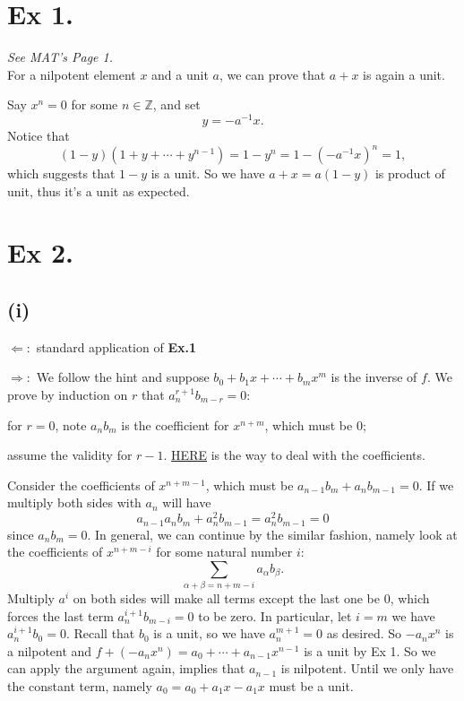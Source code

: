 
\section{Ex 1.}\label{Atiyah Chapter 1 Ex 1.}
\textit{See MAT's Page 1.}\\
For a nilpotent element $x$ and a unit $a$, we can prove that $a+x$ is again a unit.

Say $x^n=0$ for some $n\in\mathbb Z$, and set $$y=-a^{-1}x.$$
Notice that 
$$(1-y)(1+y+\cdots+y^{n-1})=1-y^n=1-(-a^{-1}x)^n=1,$$ which suggests that $1-y$ is a unit.
So we have $a+x=a(1-y)$ is product of unit, thus it's a unit as expected.



\section{Ex 2.}\label{Atiyah Chapter 1 Ex 2.}
\subsection{(i)} $\Leftarrow:$ standard application of \textbf{Ex.1}

$\Rightarrow:$ We follow the hint and suppose $b_0+b_1x+\cdots+b_mx^m$ is the inverse of $f$. We prove by induction on $r$ that $a_n^{r+1}b_{m-r}=0$:

for $r=0$, note $a_nb_m$ is the coefficient for $x^{n+m}$, which must be $0$;

assume the validity for $r-1$. \href{https://math.stackexchange.com/questions/19132/characterizing-units-in-polynomial-rings}{HERE} is the way to deal with the coefficients.

Consider the coefficients of $x^{n+m-1}$, which must be 
$a_{n-1}b_m+a_nb_{m-1}=0$. If we multiply both sides with $a_n$ will have 
$$a_{n-1}a_nb_m+a_n^2b_{m-1}=a_n^2b_{m-1}=0$$ since $a_nb_m=0$.
In general, we can continue by the similar fashion, namely look at the coefficients of $x^{n+m-i}$ for some natural number $i$: 
$$\sum_{\alpha+\beta=n+m-i}a_{\alpha}b_{\beta}.$$ Multiply $a^{i}$ on both sides will make all terms except the last one be $0$, which forces the last term $a^{i+1}_{n}b_{m-i}=0$ to be zero. In particular, let $i=m$ we have $a^{i+1}_{n}b_0=0$. Recall that $b_0$ is a unit, so we have $a^{m+1}_{n}=0$ as desired. So $-a_nx^n$ is a nilpotent and $f+(-a_nx^n)=a_0+\cdots+a_{n-1}x^{n-1}$ is a unit by Ex 1. So we can apply the argument again, implies that $a_{n-1}$ is nilpotent. Until we only have the constant term, namely $a_0=a_0+a_1x-a_1x$ must be a unit.
    
